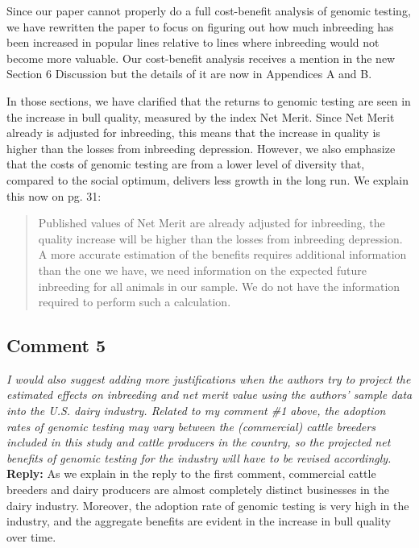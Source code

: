 \documentclass[12pt,letterpaper]{article}
\begin{document}
Since our paper cannot properly do a full cost-benefit analysis of genomic testing, we have rewritten the paper to focus on figuring out how much inbreeding has been increased in popular lines relative to lines where inbreeding would not become more valuable. Our cost-benefit analysis receives a mention in the new Section 6 Discussion but the details of it are now in Appendices A and B. 

In those sections, we have clarified that the returns to genomic testing are seen in the increase in bull quality, measured by the index Net Merit. Since Net Merit already is adjusted for inbreeding, this means that the increase in quality is higher than the losses from inbreeding depression. However, we also emphasize that the costs of genomic testing are from a lower level of diversity that, compared to the social optimum, delivers less growth in the long run. We explain this now on pg. 31:

\begin{quote}
    Published values of Net Merit are already adjusted for inbreeding, the quality increase will be higher than the losses from inbreeding depression. A more accurate estimation of the benefits requires additional information than the one we have, we need information on the expected future inbreeding for all animals in our sample. We do not have the information required to perform such a calculation.
\end{quote}

\subsection*{Comment 5}
{\it I would also suggest adding more justifications when the authors try to project the estimated effects on inbreeding and net merit value using the authors’ sample data into the U.S. dairy industry. Related to my comment \#1 above, the adoption rates of genomic testing may vary between the (commercial) cattle breeders included in this study and cattle producers in the country, so the projected net benefits of genomic testing for the industry will have to be revised accordingly.} \\

\textbf{Reply:} As we explain in the reply to the first comment, commercial cattle breeders and dairy producers are almost completely distinct businesses in the dairy industry. Moreover, the adoption rate of genomic testing is very high in the industry, and the aggregate benefits are evident in the increase in bull quality over time.
\end{document}
